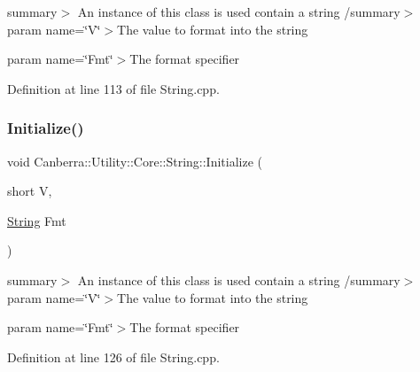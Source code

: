 summary$>$ An instance of this class is used contain a string /summary$>$ param name=\char`\"{}\+V\char`\"{}$>$The value to format into the string

param name=\char`\"{}\+Fmt\char`\"{}$>$The format specifier

Definition at line 113 of file String.\+cpp.

\mbox{\label{class_canberra_1_1_utility_1_1_core_1_1_string_a9e86f71cbebfe3572fbd977d90132288_a9e86f71cbebfe3572fbd977d90132288}} 
\subsubsection{\texorpdfstring{Initialize()}{Initialize()}\hspace{0.1cm}{\footnotesize\ttfamily [5/8]}}
{\footnotesize\ttfamily void Canberra\+::\+Utility\+::\+Core\+::\+String\+::\+Initialize (\begin{DoxyParamCaption}\item[{short}]{V,  }\item[{\hyperlink{class_canberra_1_1_utility_1_1_core_1_1_string}{String}}]{Fmt }\end{DoxyParamCaption})\hspace{0.3cm}{\ttfamily [protected]}}

summary$>$ An instance of this class is used contain a string /summary$>$ param name=\char`\"{}\+V\char`\"{}$>$The value to format into the string

param name=\char`\"{}\+Fmt\char`\"{}$>$The format specifier

Definition at line 126 of file String.\+cpp.

\mbox{\label{class_canberra_1_1_utility_1_1_core_1_1_string_a7333bb895a954eeb37b5db26d1e3ab38_a7333bb895a954eeb37b5db26d1e3ab38}} 
